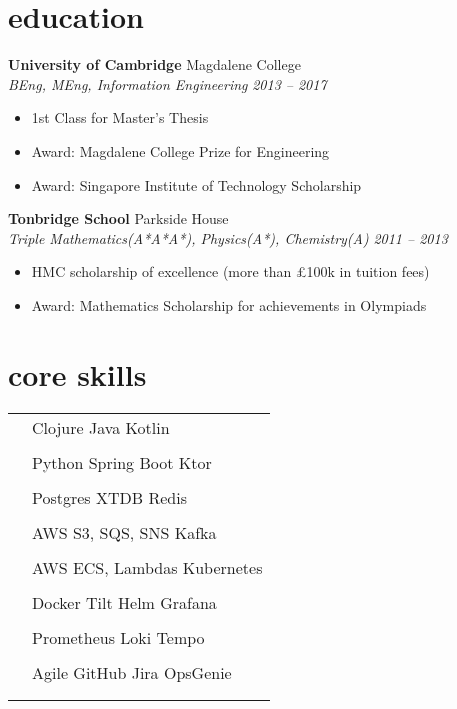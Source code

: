 \documentclass[12pt]{article}
\newcommand{\entry}[4]{{{\textbf{#1}}} \hfill #3 \\ #2 \hfill #4}
\newcommand{\tableentry}[3]{\textsc{#1} & #2\expandafter\ifstrequal\expandafter{#3}{}{\\}{\\[6pt]}}
\begin{document}
    \begin{paracol}{2}

        \section{education}

        \entry{University of Cambridge}{\textit{BEng, MEng, Information Engineering}}{Magdalene College}{\textit{2013 -- 2017}}
        \begin{itemize}[noitemsep,leftmargin=5mm,rightmargin=0mm,topsep=0pt]
            \item 1st Class for Master's Thesis
            \item Award: Magdalene College Prize for Engineering
            \item Award: Singapore Institute of Technology Scholarship
        \end{itemize}

        \smallskip
        \entry{Tonbridge School}{\textit{Triple Mathematics(A*A*A*), Physics(A*), Chemistry(A)}}{Parkside House}{\textit{2011 -- 2013}}
        \begin{itemize}[noitemsep,leftmargin=5mm,rightmargin=0mm,topsep=0pt]
            \item HMC scholarship of excellence (more than £100k in tuition fees)
            \item Award: Mathematics Scholarship for achievements in Olympiads
        \end{itemize}
        \switchcolumn

        \section{core skills}
        \bigskip
        \begin{flushleft}
            \begin{supertabular}{rl}
                \tableentry{\footnotesize\faCode}{Clojure \textperiodcentered{} Java \textperiodcentered{} Kotlin }{}
                \tableentry{}{Python \textperiodcentered{} Spring Boot \textperiodcentered{} Ktor}{}
                \tableentry{\footnotesize\faDatabase \hspace{1}}{Postgres \textperiodcentered{} XTDB \textperiodcentered{} Redis}{}
                \tableentry{}{AWS S3, SQS, SNS \textperiodcentered{} Kafka}{}

                \tableentry{\footnotesize\faDocker}{AWS ECS, Lambdas \textperiodcentered{} Kubernetes}{}
                \tableentry{}{Docker  \textperiodcentered{} Tilt \textperiodcentered{} Helm  \textperiodcentered{} Grafana}{}
                \tableentry{}{Prometheus \textperiodcentered{} Loki \textperiodcentered{} Tempo }{}
                \tableentry{\footnotesize\faAtlassian}{Agile \textperiodcentered{} GitHub \textperiodcentered{} Jira \textperiodcentered{} OpsGenie}{}
            \end{supertabular}
        \end{flushleft}
    \end{paracol}
\end{document}
